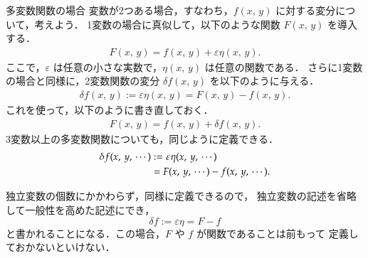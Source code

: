                 \begin{mysmallsec}{多変数関数の場合}
                    変数が2つある場合，すなわち，$f(x,\,y)$ に対する変分について，考えよう．
                    1変数の場合に真似して，以下のような関数 $F(x,\,y)$ を導入する．
                        \begin{align}
                            F(x,\,y) = f(x,\,y) + \varepsilon \eta(x,\,y).
                        \end{align}
                    ここで，$\varepsilon$ は任意の小さな実数で，$\eta(x,\,y)$ は任意の関数である．
                    さらに1変数の場合と同様に，2変数関数の変分 $\delta f(x,\,y)$ を以下のように与える．
                        \begin{align}
                            \delta f(x,\,y) := \varepsilon \eta(x,\,y) = F(x,\,y) - f(x,\,y).
                        \end{align}
                    これを使って，以下のように書き直しておく．
                        \begin{align}
                            F(x,\,y) = f(x,\,y) + \delta f(x,\,y).
                        \end{align}
                    3変数以上の多変数関数についても，同じように定義できる．
                        \begin{align}
                            \delta f(x,\,y,\,\cdots) &:= \varepsilon \eta(x,\,y,\,\cdots) \notag \\
                                                     &= F(x,\,y,\,\cdots) - f(x,\,y,\,\cdots).
                        \end{align}

                        独立変数の個数にかかわらず，同様に定義できるので，
                    独立変数の記述を省略して一般性を高めた記述にでき，
                        \begin{equation*}
                            \delta f := \varepsilon \eta = F - f
                        \end{equation*}
                    と書かれることになる．この場合，$F$ や $f$ が関数であることは前もって
                    定義しておかないといけない．
                \end{mysmallsec}

